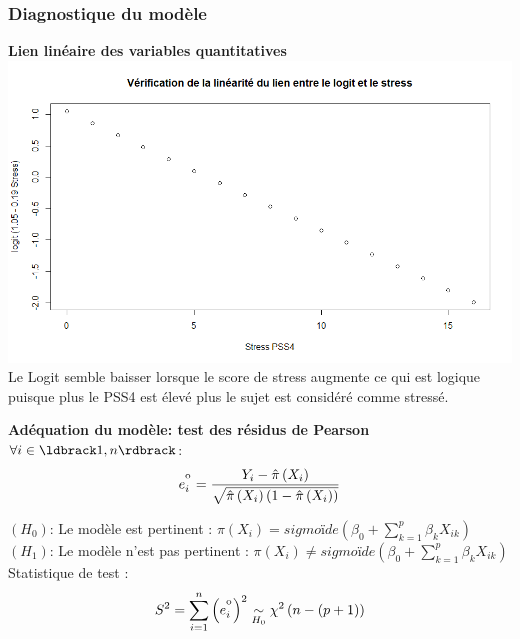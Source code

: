 \documentclass{book}
\begin{document}
\subsubsection{Diagnostique du modèle}

\noindent
\textbf{Lien linéaire des variables quantitatives}\\
\includegraphics[scale=.5]{linearite_stress.png}\\
Le Logit semble baisser lorsque le score de stress augmente ce qui est logique puisque plus le PSS4 est élevé plus le sujet est considéré comme stressé.\\
\bigskip

\noindent
\textbf{Adéquation du modèle: test des résidus de Pearson}\\

\bigskip
\noindent
$\forall i \in \ldbrack 1,n \rdbrack$:\\
\begin{align*}
e_i^{\textsuperscript{o}} = {
{Y_i - \hat{\pi}\left(X_i\right)} 
\over 
{\sqrt{\hat{\pi}\left(X_i\right)\left(1-\hat{\pi}\left(X_i\right)\right)}}
}
\end{align*}

\noindent
$\left( H_0 \right)$: Le modèle est pertinent : $\pi\left(X_i\right) = sigmoïde\left(\beta_0 + \sum_{k=1}^p {\beta_k X_{ik}}\right)$\\
$\left( H_1 \right)$: Le modèle n'est pas pertinent : $\pi\left(X_i\right) \neq sigmoïde\left(\beta_0 + \sum_{k=1}^p {\beta_k X_{ik}}\right)$\\
Statistique de test : \\
\begin{align*}
S^2 = \sum_{i = 1}^n {{\left(e_i^{\textsuperscript{o}}\right)}^2} 
\underset{\tiny{H_0}}{\sim}
\chi ^2 \left(n-\left( p+1 \right)\right)
\\
\end{align*}
\end{document}
